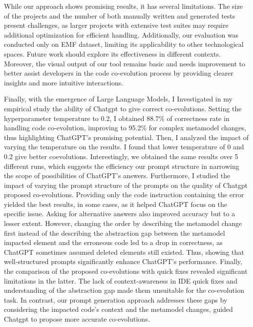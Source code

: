While our approach shows promising results, it has several limitations. The size of the projects and the number of both manually written and generated tests present challenges, as larger projects with extensive test suites may require additional optimization for efficient handling. Additionally, our evaluation was conducted only on EMF dataset, limiting its applicability to other technological spaces. Future work should explore its effectiveness in different contexts. Moreover, the visual output of our tool remains basic and needs improvement to better assist developers in the code co-evolution process by providing clearer insights and more intuitive interactions.

Finally, with the emergence of Large Language Models, I Investigated in my empirical study the ability of Chatgpt to give correct co-evolutions. Setting the hyperparameter temperature to 0.2, I obtained  88.7\% of correctness rate in handling code co-evolution, improving to 95.2\% for complex metamodel changes, thus highlighting ChatGPT’s promising potential. Then, I analyzed the impact of varying the temperature on the results. I found that lower temperature of 0 and 0.2 give better coevolutions. Interestingly, we obtained the same results over 5 different runs, which suggests the efficiency our
prompt structure in narrowing the scope of possibilities of ChatGPT’s answers. Furthermore, I studied the impact of varying the prompt structure of the prompts on the quality of Chatgpt proposed co-evolutions. Providing only the code instruction containing the error yielded the best results, in some cases, as it helped ChatGPT focus on the specific issue. Asking for alternative answers also improved accuracy but to a lesser extent. However, changing the order by describing the metamodel change first instead of the describing the abstraction gap between the metamodel impacted element and the erroneous code led to a drop in correctness, as ChatGPT sometimes assumed deleted elements still existed. Thus, showing that well-structured prompts significantly enhance ChatGPT’s performance. Finally, the comparison of the proposed co-evolutions with quick fixes revealed significant limitations in the latter. The lack of context-awareness in IDE quick fixes and understanding of the abstraction gap made them unsuitable for the co-evolution task. In contrast, our prompt generation approach addresses these gaps by considering the impacted code’s context and the metamodel changes, guided Chatgpt to propose more accurate co-evolutions.

